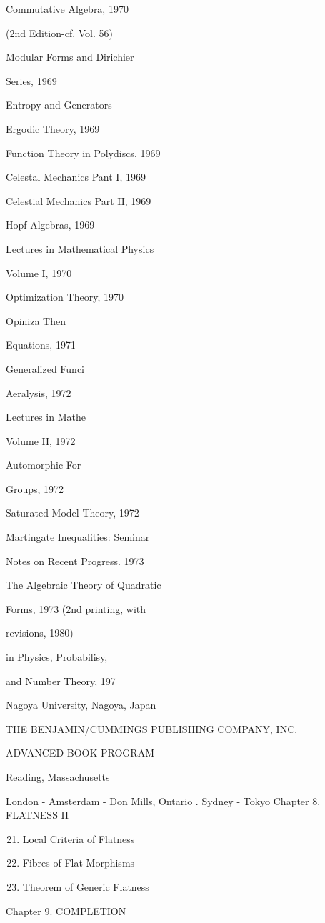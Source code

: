 Commutative Algebra, 1970

(2nd Edition-cf. Vol. 56)

Modular Forms and Dirichier

Series, 1969

Entropy and Generators

Ergodic Theory, 1969

Function Theory in Polydiscs, 1969

Celestal Mechanics Pant I, 1969

Celestial Mechanics Part II, 1969

Hopf Algebras, 1969

Lectures in Mathematical Physics

Volume I, 1970

Optimization Theory, 1970

Opiniza Then

Equations, 1971

Generalized Funci

Aeralysis, 1972

Lectures in Mathe

Volume II, 1972

Automorphic For

Groups, 1972

Saturated Model Theory, 1972

Martingate Inequalities: Seminar

Notes on Recent Progress. 1973

The Algebraic Theory of Quadratic

Forms, 1973 (2nd printing, with

revisions, 1980)

in Physics, Probabilisy,

and Number Theory, 197



Nagoya University, Nagoya, Japan

THE BENJAMIN/CUMMINGS PUBLISHING COMPANY, INC.

ADVANCED BOOK PROGRAM

Reading, Massachusetts

London - Amsterdam - Don Mills, Ontario . Sydney - Tokyo Chapter 8. FLATNESS II

\begin{enumerate}
  \setcounter{enumi}{20}
  \item Local Criteria of Flatness

  \item Fibres of Flat Morphisms

  \item Theorem of Generic Flatness

\end{enumerate}
Chapter 9. COMPLETION

